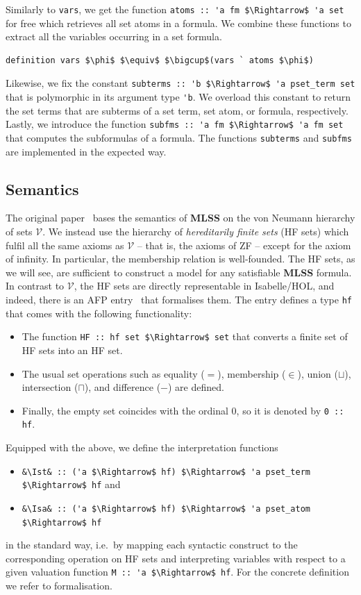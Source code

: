 \documentclass[runningheads]{llncs}
\newcommand{\MLSS}{\textbf{MLSS}}
\newcommand{\Ist}{I$_\text{st}$}
\newcommand{\Isa}{I$_\text{sa}$}
\newcommand{\hfmem}{\boldsymbol{\in}}
\begin{document}
Similarly to \lstinline!vars!, we get the function \lstinline!atoms :: 'a fm $\Rightarrow$ 'a set! for free which retrieves all set atoms in a formula.
We combine these functions to extract all the variables occurring in a set formula.
\begin{lstlisting}
definition vars $\phi$ $\equiv$ $\bigcup$(vars ` atoms $\phi$)
\end{lstlisting}

Likewise, we fix the constant \lstinline!subterms :: 'b $\Rightarrow$ 'a pset_term set! that is polymorphic in its argument type \lstinline!'b!.
We overload this constant to return the set terms that are subterms of a set term, set atom, or formula, respectively.
Lastly, we introduce the function \lstinline!subfms :: 'a fm $\Rightarrow$ 'a fm set! that computes the subformulas of a formula.
The functions \lstinline!subterms! and \lstinline!subfms! are implemented in the expected way.

\subsection{Semantics}
The original paper~\cite{new_fast_tableau} bases the semantics of \MLSS{} on the von Neumann hierarchy of sets $\mathcal{V}$.
We instead use the hierarchy of \emph{hereditarily finite sets} (HF sets) which fulfil all the same axioms as $\mathcal{V}$ -- that is, the axioms of ZF -- except for the axiom of infinity.
In particular, the membership relation is well-founded.
The HF sets, as we will see, are sufficient to construct a model for any satisfiable \MLSS{} formula.
In contrast to $\mathcal{V}$, the HF sets are directly representable in Isabelle/HOL, and indeed, there is an AFP entry~\cite{hf_AFP} that formalises them.
The entry defines a type \lstinline!hf! that comes with the following functionality:
\begin{itemize}
  \item The function \lstinline!HF :: hf set $\Rightarrow$ set! that converts a finite set of HF sets into an HF set.
\item The usual set operations such as equality ($=$), membership ($\hfmem$), union ($\sqcup$), intersection ($\sqcap$), and difference ($-$) are defined.
\item Finally, the empty set coincides with the ordinal $0$, so it is denoted by \lstinline!0 :: hf!.
\end{itemize}

Equipped with the above, we define the interpretation functions 
\begin{itemize}
  \item \lstinline!&\Ist& :: ('a $\Rightarrow$ hf) $\Rightarrow$ 'a pset_term $\Rightarrow$ hf! and 
  \item \lstinline!&\Isa& :: ('a $\Rightarrow$ hf) $\Rightarrow$ 'a pset_atom $\Rightarrow$ hf!
\end{itemize}
in the standard way, i.e.\ by mapping each syntactic construct to the corresponding operation on HF sets and interpreting variables with respect to a given valuation function \lstinline!M :: 'a $\Rightarrow$ hf!.
For the concrete definition we refer to formalisation.
\end{document}
